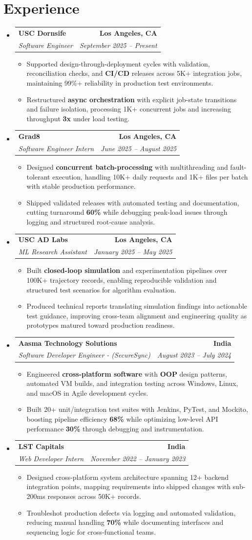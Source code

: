 \documentclass[letterpaper,10pt]{article}
\makeatletter
\newcommand{\resumeItem}[1]{\item\small{{#1 \vspace{-2pt}}}}
\newcommand{\resumeSubheading}[4]{\vspace{-1pt}\item\begin{tabular*}{1.0\textwidth}[t]{l@{\extracolsep{\fill}}r}\textbf{#1} & \textbf{\small #2} \\\textit{\small#3} & \textit{\small #4} \\\end{tabular*}\vspace{-2pt}}
\newcommand{\resumeSubHeadingListStart}{\begin{itemize}[leftmargin=0.0in, label={}]}
\newcommand{\resumeSubHeadingListEnd}{\end{itemize}}
\newcommand{\resumeItemListStart}{\begin{itemize}[leftmargin=0.15in,label=\textbullet,itemsep=2pt,topsep=0pt,parsep=0pt,partopsep=0pt]}
\newcommand{\resumeItemListEnd}{\end{itemize}\vspace{-4pt}}
\makeatother
\begin{document}
\section{Experience}
\resumeSubHeadingListStart
\resumeSubheading{USC Dornsife}{Los Angeles, CA}{Software Engineer}{September 2025 -- Present}
\resumeItemListStart
\resumeItem{Supported design-through-deployment cycles with validation, reconciliation checks, and \textbf{CI/CD} releases across 5K+ integration jobs, maintaining 99\%+ reliability in production test environments.}
\resumeItem{Restructured \textbf{async orchestration} with explicit job-state transitions and failure isolation, processing 1K+ concurrent jobs and increasing throughput \textbf{3x} under load testing.}
\resumeItemListEnd
\resumeSubheading{Grad8}{Los Angeles, CA}{Software Engineer Intern}{June 2025 -- August 2025}
\resumeItemListStart
\resumeItem{Designed \textbf{concurrent batch-processing} with multithreading and fault-tolerant execution, handling 10K+ daily requests and 1K+ files per batch with stable production performance.}
\resumeItem{Shipped validated releases with automated testing and documentation, cutting turnaround \textbf{60\%} while debugging peak-load issues through logging and structured root-cause analysis.}
\resumeItemListEnd
\resumeSubheading{USC AD Labs}{Los Angeles, CA}{ML Research Assistant}{January 2025 -- May 2025}
\resumeItemListStart
\resumeItem{Built \textbf{closed-loop simulation} and experimentation pipelines over 100K+ trajectory records, enabling reproducible validation and structured test scenarios for algorithm evaluation.}
\resumeItem{Produced technical reports translating simulation findings into actionable test guidance, improving cross-team alignment and engineering quality as prototypes matured toward production readiness.}
\resumeItemListEnd
\resumeSubheading{Aasma Technology Solutions}{India}{Software Developer Engineer - (SecureSync)}{August 2023 -- July 2024}
\resumeItemListStart
\resumeItem{Engineered \textbf{cross-platform software} with \textbf{OOP} design patterns, automated VM builds, and integration testing across Windows, Linux, and macOS in Agile development cycles.}
\resumeItem{Built 20+ unit/integration test suites with Jenkins, PyTest, and Mockito, boosting pipeline efficiency \textbf{68\%} while optimizing low-level API performance \textbf{30\%} through debugging and instrumentation.}
\resumeItemListEnd
\resumeSubheading{LST Capitals}{India}{Web Developer Intern}{November 2022 -- January 2023}
\resumeItemListStart
\resumeItem{Designed cross-platform system architecture spanning 12+ backend integration points, mapping requirements into shipped changes with sub-200ms responses across 50K+ records.}
\resumeItem{Troubleshot production defects via logging and automated validation, reducing manual handling \textbf{70\%} while documenting interfaces and sequencing logic for cross-functional teams.}
\resumeItemListEnd
\resumeSubHeadingListEnd
\vspace{-6pt}
\end{document}
